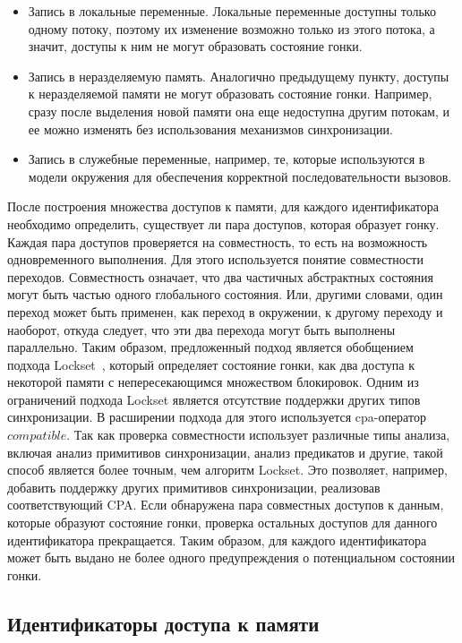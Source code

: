 \begin{itemize}
\item Запись в локальные переменные. Локальные переменные доступны только одному потоку, поэтому их изменение возможно только из этого потока, а значит, доступы к ним не могут образовать состояние гонки.
\item Запись в неразделяемую память. Аналогично предыдущему пункту, доступы к неразделяемой памяти не могут образовать состояние гонки. Например, сразу после выделения новой памяти она еще недоступна другим потокам, и ее можно изменять без использования механизмов синхронизации.
\item Запись в служебные переменные, например, те, которые используются в модели окружения для обеспечения корректной последовательности вызовов. 
\end{itemize}

После построения множества доступов к памяти, для каждого идентификатора необходимо определить, существует ли пара доступов, которая образует гонку.
Каждая пара доступов проверяется на совместность, то есть на возможность одновременного выполнения.
Для этого используется понятие совместности переходов. Совместность означает, что два частичных абстрактных состояния могут быть частью одного глобального состояния.
Или, другими словами, один переход может быть применен, как переход в окружении, к другому переходу и наоборот, откуда следует, что эти два перехода могут быть выполнены параллельно.
Таким образом, предложенный подход является обобщением подхода Lockset~\cite{eraser97}, который определяет состояние гонки, как два доступа к некоторой памяти с непересекающимся множеством блокировок.
Одним из ограничений подхода Lockset является отсутствие поддержки других типов синхронизации.
В расширении подхода для этого используется cpa-оператор $compatible$. 
Так как проверка совместности использует различные типы анализа, включая анализ примитивов синхронизации, анализ предикатов и другие, такой способ является более точным, чем алгоритм Lockset.
Это позволяет, например, добавить поддержку других примитивов синхронизации, реализовав соответствующий CPA.
Если обнаружена пара совместных доступов к данным, которые образуют состояние гонки, проверка остальных доступов для данного идентификатора прекращается.
Таким образом, для каждого идентификатора может быть выдано не более одного предупреждения о потенциальном состоянии гонки.

\subsection{Идентификаторы доступа к памяти}
\label{subsect_impl_identifiers}

